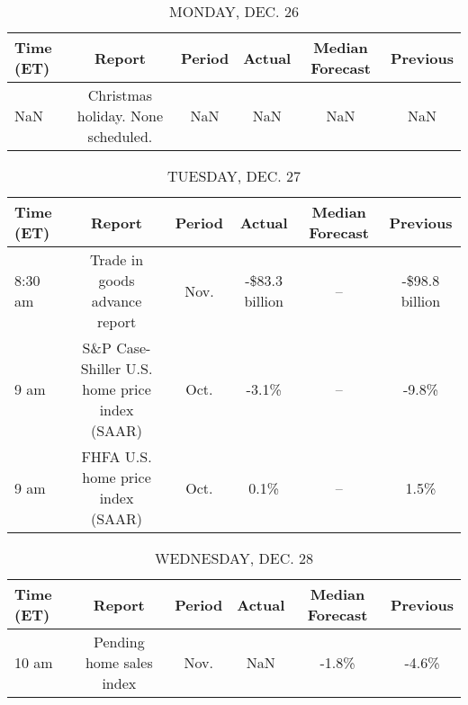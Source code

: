 \documentclass{article}%
\begin{document}
%
\normalsize%


\begin{table}[htbp]%
\caption{MONDAY, DEC. 26}%
\centering%
\begin{adjustbox}{width=1\textwidth}%
\begin{tabular}{lccccc}
\toprule
Time (ET) &                             Report & Period & Actual & Median Forecast & Previous \\
\midrule
      NaN & Christmas holiday. None scheduled. &    NaN &    NaN &             NaN &      NaN \\
\bottomrule
\end{tabular}
%
\end{adjustbox}%
\end{table}

%


\begin{table}[htbp]%
\caption{TUESDAY, DEC. 27}%
\centering%
\begin{adjustbox}{width=1\textwidth}%
\begin{tabular}{lccccc}
\toprule
Time (ET) &                                        Report & Period &         Actual & Median Forecast &       Previous \\
\midrule
  8:30 am &                 Trade in goods advance report &   Nov. & -\$83.3 billion &              -- & -\$98.8 billion \\
     9 am & S\&P Case-Shiller U.S. home price index (SAAR) &   Oct. &          -3.1\% &              -- &          -9.8\% \\
     9 am &             FHFA U.S. home price index (SAAR) &   Oct. &           0.1\% &              -- &           1.5\% \\
\bottomrule
\end{tabular}
%
\end{adjustbox}%
\end{table}

%


\begin{table}[htbp]%
\caption{WEDNESDAY, DEC. 28}%
\centering%
\begin{adjustbox}{width=1\textwidth}%
\begin{tabular}{lccccc}
\toprule
Time (ET) &                   Report & Period & Actual & Median Forecast & Previous \\
\midrule
    10 am & Pending home sales index &   Nov. &    NaN &           -1.8\% &    -4.6\% \\
\bottomrule
\end{tabular}
%
\end{adjustbox}%
\end{table}
\end{document}
